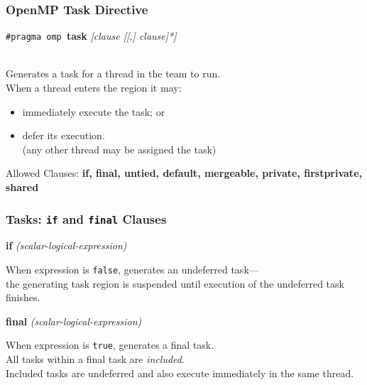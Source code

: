 \begin{frame}
  \frametitle{OpenMP Task Directive}

  
  \begin{center}
    {\tt \#pragma omp }{\bf task} {\it [clause [[,] clause]*]}
  \end{center}~\\

     Generates a task for a thread in the team to run.\\[1em]
     When a thread enters the region it may:
      \begin{itemize}
        \item immediately execute the task; or
        \item defer its execution.\\\qquad  (any other thread may be assigned the task)
      \end{itemize}

  Allowed Clauses: {\bf if, final, untied, default, mergeable, private,
  firstprivate, shared}
  
\end{frame}

\begin{frame}
  \frametitle{Tasks: {\tt if} and {\tt final} Clauses}

  
  \begin{center}
  {\bf if} {\it(scalar-logical-expression)}
  \end{center}

    When expression is {\tt false}, generates an undeferred task---\\
    the generating task region is suspended until execution of the
      undeferred task finishes.\\[1em]

  \begin{center}
  {\bf final} {\it(scalar-logical-expression)}
  \end{center}

    When expression is {\tt true}, generates a final task.\\
    All tasks within a final task are {\it included}.\\
    Included tasks are undeferred and also execute immediately in the same thread.
  
\end{frame}

